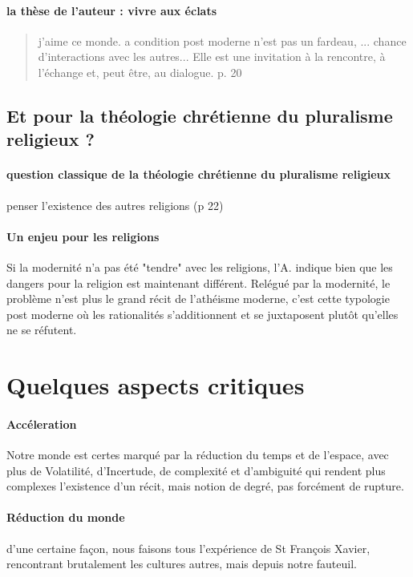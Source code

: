 \paragraph{la thèse de l'auteur : vivre aux éclats} 
\begin{quote}
  j'aime ce monde. a condition post moderne n'est pas un fardeau, ... chance d'interactions avec les autres... 
    Elle est une invitation à la rencontre, à l'échange et, peut être, au dialogue. p. 20
\end{quote}

\subsection{Et pour la théologie chrétienne du pluralisme religieux ? }

\paragraph{question classique de la théologie chrétienne du pluralisme religieux} penser l'existence des autres religions (p 22)

\paragraph{Un enjeu pour les religions} Si la modernité n'a pas été "tendre" avec les religions, l'A. indique bien que les dangers pour la religion est maintenant différent. Relégué par la modernité, le problème n'est plus le grand récit de l'athéisme moderne, c'est cette typologie post moderne où les rationalités s'additionnent et se juxtaposent plutôt qu'elles ne se réfutent. 


\section{Quelques aspects critiques} 

\paragraph{Accéleration} Notre monde est certes marqué par la réduction du temps et de l'espace, avec plus de Volatilité, d'Incertude, de complexité et d'ambiguité qui rendent plus complexes l'existence d'un récit, mais notion de degré, pas forcément de rupture.

\paragraph{Réduction du monde}d'une certaine façon, nous faisons tous l'expérience de St François Xavier, rencontrant brutalement les cultures autres, mais depuis notre fauteuil.


